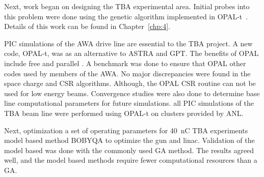 Next, work began on designing the TBA experimental area. 
Initial probes into this problem were done using the genetic algorithm
implemented in OPAL-t~\cite{optpilot}. Details of this work can be found in Chapter~\ref{chp:4}.


PIC simulations of the AWA drive line are essential to the TBA project. 
A new code, OPAL-t, was  as an alternative to ASTRA and GPT. 
The benefits of OPAL include  free and  parallel .
A benchmark was done to ensure that OPAL  other codes used by members of the AWA.
No major discrepancies were found in the space charge and CSR algorithms.
Although,  the OPAL CSR routine can not be used for low energy beams.
Convergence studies were also done to determine base line computational 
parameters for future simulations.
 all PIC simulations of the TBA beam line  were performed using OPAL-t on clusters provided by ANL.

Next, optimization  a set of operating parameters for
\SI{40}{nC} TBA experiments  model based method BOBYQA  to optimize the gun and linac. 
Validation of the model based  was done  with the commonly used GA method. The results agreed well, and  the model based 
methods require fewer computational resources than a GA. 






